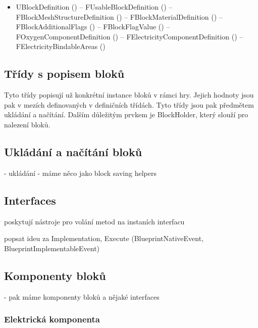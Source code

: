 \begin{itemize}
	\item UBlockDefinition ()
		\subitem -- FUsableBlockDefinition ()
		\subitem -- FBlockMeshStructureDefinition ()
			\subsubitem -- FBlockMaterialDefinition ()
		\subitem -- FBlockAdditionalFlags ()
			\subsubitem -- FBlockFlagValue ()	
		\subitem -- FOxygenComponentDefinition ()
		\subitem -- FElectricityComponentDefinition ()
			\subsubitem -- FElectricityBindableAreas ()	
				
		

\end{itemize}

\subsection{Třídy s popisem bloků}
Tyto třídy popisují už konkrétní instance bloků v rámci hry. Jejich hodnoty jsou pak v mezích definovaných v definičních třídách. Tyto třídy jsou pak předmětem ukládání a načítání. Dalším důležitým prvkem je BlockHolder, který slouží pro nalezení bloků. 

\subsection{Ukládání a načítání bloků}

- ukládání - máme něco jako block saving helpers


\subsection{Interfaces}
poskytují nástroje pro volání metod na instaních interfacu

popsat ideu za Implementation, Execute (BlueprintNativeEvent, BlueprintImplementableEvent)

\subsection{Komponenty bloků}
- pak máme komponenty bloků a nějaké interfaces

\subsubsection{Elektrická komponenta}


